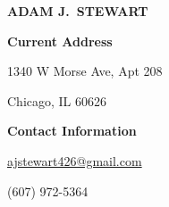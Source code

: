 
\begin{center}

    \textbf{\uppercase{\Large Adam J.\ Stewart}}

\end{center}

\vspace{-12pt}

\begin{multicols}{2}

    \begin{flushleft}

        \textbf{Current Address}

        1340 W Morse Ave, Apt 208

        Chicago, IL 60626

    \end{flushleft}

    \columnbreak

    \begin{flushright}

        \textbf{Contact Information}

        \href{mailto:ajstewart426@gmail.com}{ajstewart426@gmail.com}

        (607) 972-5364

    \end{flushright}

\end{multicols}
